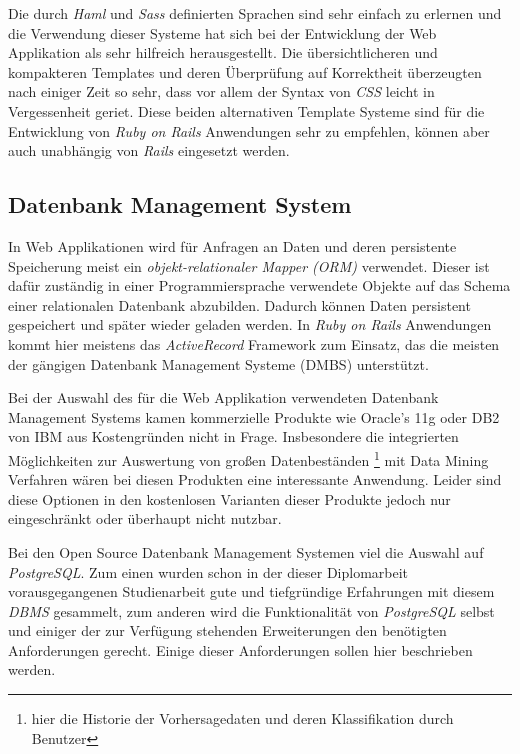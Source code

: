 Die durch \textit{Haml} und \textit{Sass} definierten Sprachen sind
sehr einfach zu erlernen und die Verwendung dieser Systeme hat sich
bei der Entwicklung der Web Applikation als sehr hilfreich
herausgestellt. Die übersichtlicheren und kompakteren Templates und
deren Überprüfung auf Korrektheit überzeugten nach einiger Zeit so
sehr, dass vor allem der Syntax von \textit{CSS} leicht in
Vergessenheit geriet. Diese beiden alternativen Template Systeme sind
für die Entwicklung von \textit{Ruby on Rails} Anwendungen sehr zu
empfehlen, können aber auch unabhängig von \textit{Rails} eingesetzt
werden.

\subsection{Datenbank Management System}

In Web Applikationen wird für Anfragen an Daten und deren persistente
Speicherung meist ein \textit{objekt-relationaler Mapper (ORM)}
verwendet. Dieser ist dafür zuständig in einer Programmiersprache
verwendete Objekte auf das Schema einer relationalen Datenbank
abzubilden. Dadurch können Daten persistent gespeichert und später
wieder geladen werden. In \textit{Ruby on Rails} Anwendungen kommt
hier meistens das \textit{ActiveRecord} Framework zum Einsatz, das die
meisten der gängigen Datenbank Management Systeme (DMBS) unterstützt.

Bei der Auswahl des für die Web Applikation verwendeten Datenbank
Management Systems kamen kommerzielle Produkte wie Oracle's 11g oder
DB2 von IBM aus Kostengründen nicht in Frage. Insbesondere die
integrierten Möglichkeiten zur Auswertung von großen Datenbeständen
\footnote{hier die Historie der Vorhersagedaten und deren
  Klassifikation durch Benutzer} mit Data Mining Verfahren wären bei
diesen Produkten eine interessante Anwendung. Leider sind diese
Optionen in den kostenlosen Varianten dieser Produkte jedoch nur
eingeschränkt oder überhaupt nicht nutzbar.

Bei den Open Source Datenbank Management Systemen viel die Auswahl auf
\textit{PostgreSQL}. Zum einen wurden schon in der dieser Diplomarbeit
vorausgegangenen Studienarbeit gute und tiefgründige Erfahrungen mit
diesem \textit{DBMS} gesammelt, zum anderen wird die Funktionalität
von \textit{PostgreSQL} selbst und einiger der zur Verfügung stehenden
Erweiterungen den benötigten Anforderungen gerecht. Einige dieser
Anforderungen sollen hier beschrieben werden.


